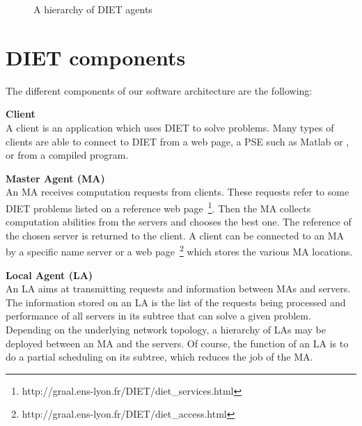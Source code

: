 \begin{figure}[htb]
 \begin{center}
  \caption{\label{fig:platform}A hierarchy of DIET agents}
 \end{center}
\end{figure}

\section{DIET components}
\label{sec:components}

The different components of our software architecture are the following:      

\begin{description}
\item \textbf{Client}\\
  A client is an application which uses DIET to solve problems.  Many
  types of clients are able to connect to DIET from a web page, a PSE
  such as Matlab or \sci, or from a compiled program.
\item \textbf{Master Agent (MA)}\\
  An MA receives computation requests from clients. These requests
  refer to some DIET problems listed on a reference web
  page~\footnote{http://graal.ens-lyon.fr/DIET/diet\_services.html}.
  Then the MA collects computation abilities from the servers and
  chooses the best one. The reference of the chosen server is returned
  to the client. A client can be connected to an MA by a specific name
  server or a web
  page~\footnote{http://graal.ens-lyon.fr/DIET/diet\_access.html}
  which stores the various MA locations.

\item \textbf{Local Agent (LA)}\\
  An LA aims at transmitting requests and information between MAs and
  servers.  The information stored on an LA is the list of the
  requests being processed and performance of all servers in its
  subtree that can solve a given problem. Depending on the underlying
  network topology, a hierarchy of LAs may be deployed between an MA
  and the servers. Of course, the function of an LA is to do a partial
  scheduling on its subtree, which reduces the job of the MA.


\end{description}
